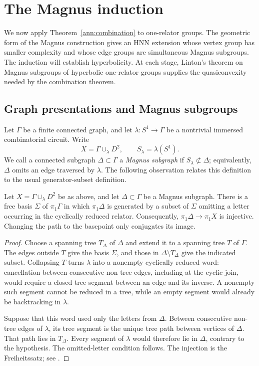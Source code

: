 \section{The Magnus induction}\label{mag:section}

We now apply Theorem~\ref{ann:combination} to one-relator groups.
The geometric form of the Magnus construction gives an HNN extension
whose vertex group has smaller complexity and whose edge groups are
simultaneous Magnus subgroups.  The induction will establish
hyperbolicity.  At each stage, Linton's theorem on Magnus subgroups
of hyperbolic one-relator groups supplies the quasiconvexity needed
by the combination theorem.

\subsection{Graph presentations and Magnus subgroups}

Let $\Gamma$ be a finite connected graph, and let
$\lambda\colon S^1\to\Gamma$ be a nontrivial immersed combinatorial
circuit.  Write
\[
 X=\Gamma\cup_\lambda D^2,
 \qquad S_\lambda=\lambda(S^1).
\]
We call a connected subgraph $\Delta\subset\Gamma$ a
\emph{Magnus subgraph} if $S_\lambda\not\subset\Delta$; equivalently,
$\Delta$ omits an edge traversed by $\lambda$.
The following observation relates this definition to the usual
generator-subset definition.

\begin{lemma}\label{mag:graph-magnus}
Let $X=\Gamma\cup_\lambda D^2$ be as above, and let
$\Delta\subset\Gamma$ be a Magnus subgraph.  There is a free basis
$\Sigma$ of $\pi_1\Gamma$ in which $\pi_1\Delta$ is generated by a
subset of $\Sigma$ omitting a letter occurring in the cyclically
reduced relator.  Consequently, $\pi_1\Delta\to\pi_1X$ is injective.
Changing the path to the basepoint only conjugates its image.
\end{lemma}

\begin{proof}
Choose a spanning tree $T_\Delta$ of $\Delta$ and extend it to a
spanning tree $T$ of $\Gamma$.  The edges outside $T$ give the basis
$\Sigma$, and those in $\Delta\setminus T_\Delta$ give the indicated
subset.  Collapsing $T$ turns $\lambda$ into a nonempty cyclically
reduced word: cancellation between consecutive non-tree edges,
including at the cyclic join, would require a closed tree segment
between an edge and its inverse.  A nonempty such segment cannot
be reduced in a tree, while an empty segment would already be
backtracking in $\lambda$.

Suppose that this word used only the letters from $\Delta$.
Between consecutive non-tree edges of $\lambda$, its tree segment
is the unique tree path between vertices of $\Delta$.
That path lies in $T_\Delta$.  Every segment of $\lambda$ would
therefore lie in $\Delta$, contrary to the hypothesis.
The omitted-letter condition follows.  The injection is the
Freiheitssatz; see \cite[Theorem~1]{McCoolSchupp1973}.
\end{proof}

